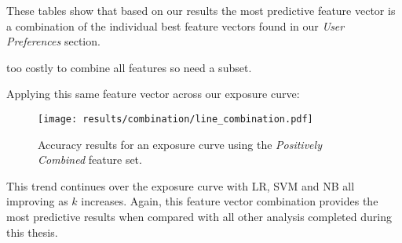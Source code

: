 These tables show that based on our results the most predictive feature vector is a combination of the individual best 
feature vectors found in our \emph{User Preferences} section.

too costly to combine all features so need a subset.

\clearpage

Applying this same feature vector across our exposure curve:

\begin{figure}[h]
	\begin{center}
		\texttt{[image: results/combination/line\_combination.pdf]}
		\caption{Accuracy results for an exposure curve using the \emph{Positively Combined} feature set.}
	\end{center}
\end{figure}

This trend continues over the exposure curve with LR, SVM and NB all improving as $k$ increases. Again, this feature vector 
combination provides the most predictive results when compared with all other analysis completed during this thesis.

\clearpage

